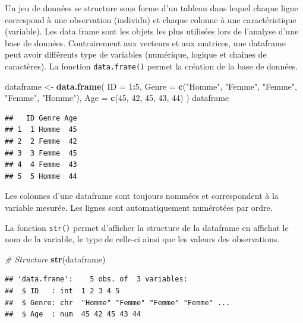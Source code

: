 \documentclass[
]{book}
\newenvironment{Shaded}{\begin{snugshade}}{\end{snugshade}}
\newcommand{\AttributeTok}[1]{\textcolor[rgb]{0.13,0.29,0.53}{#1}}
\newcommand{\CommentTok}[1]{\textcolor[rgb]{0.56,0.35,0.01}{\textit{#1}}}
\newcommand{\DecValTok}[1]{\textcolor[rgb]{0.00,0.00,0.81}{#1}}
\newcommand{\FunctionTok}[1]{\textcolor[rgb]{0.13,0.29,0.53}{\textbf{#1}}}
\newcommand{\NormalTok}[1]{#1}
\newcommand{\OtherTok}[1]{\textcolor[rgb]{0.56,0.35,0.01}{#1}}
\newcommand{\SpecialCharTok}[1]{\textcolor[rgb]{0.81,0.36,0.00}{\textbf{#1}}}
\newcommand{\StringTok}[1]{\textcolor[rgb]{0.31,0.60,0.02}{#1}}
\begin{document}
Un jeu de données se structure sous forme d'un tableau dans lequel chaque ligne correspond à une observation (individu) et chaque colonne à une caractéristique (variable). Les data frame sont les objets les plus utilisées lors de l'analyse d'une base de données. Contrairement aux vecteurs et aux matrices, une dataframe peut avoir différents type de variables (numérique, logique et chaînes de caractères). La fonction \texttt{data.frame()} permet la création de la base de données.

\begin{Shaded}
\begin{Highlighting}[]
\NormalTok{dataframe }\OtherTok{\textless{}{-}} \FunctionTok{data.frame}\NormalTok{(}
  \AttributeTok{ID =} \DecValTok{1}\SpecialCharTok{:}\DecValTok{5}\NormalTok{,}
  \AttributeTok{Genre =} \FunctionTok{c}\NormalTok{(}\StringTok{"Homme"}\NormalTok{, }\StringTok{"Femme"}\NormalTok{, }\StringTok{"Femme"}\NormalTok{, }\StringTok{"Femme"}\NormalTok{, }\StringTok{"Homme"}\NormalTok{),}
  \AttributeTok{Age =} \FunctionTok{c}\NormalTok{(}\DecValTok{45}\NormalTok{, }\DecValTok{42}\NormalTok{, }\DecValTok{45}\NormalTok{, }\DecValTok{43}\NormalTok{, }\DecValTok{44}\NormalTok{)}
\NormalTok{)}
\NormalTok{dataframe}
\end{Highlighting}
\end{Shaded}

\begin{verbatim}
##   ID Genre Age
## 1  1 Homme  45
## 2  2 Femme  42
## 3  3 Femme  45
## 4  4 Femme  43
## 5  5 Homme  44
\end{verbatim}

Les colonnes d'une dataframe sont toujours nommées et correspondent à la variable mesurée. Les lignes sont automatiquement numérotées par ordre.

La fonction \texttt{str()} permet d'afficher la structure de la dataframe en affichat le nom de la variable, le type de celle-ci ainsi que les valeurs des observations.

\begin{Shaded}
\begin{Highlighting}[]
\CommentTok{\# Structure}
\FunctionTok{str}\NormalTok{(dataframe)}
\end{Highlighting}
\end{Shaded}

\begin{verbatim}
## 'data.frame':    5 obs. of  3 variables:
##  $ ID   : int  1 2 3 4 5
##  $ Genre: chr  "Homme" "Femme" "Femme" "Femme" ...
##  $ Age  : num  45 42 45 43 44
\end{verbatim}
\end{document}
